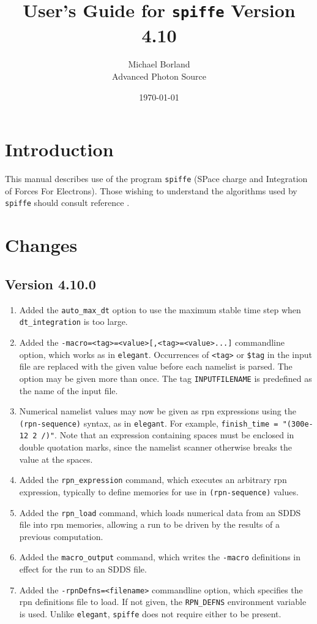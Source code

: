 \documentclass[11pt]{article}
\begin{document}
\title{User's Guide for {\tt spiffe} Version 4.10}
\author{Michael Borland\\Advanced Photon Source\\ \date{\today}}
\maketitle

\section{Introduction}

This manual describes use of the program {\tt spiffe} (SPace charge and
Integration of Forces For Electrons).  Those wishing to understand the
algorithms used by {\tt spiffe} should consult reference \cite{spiffeEqn}.

\section{Changes}
\subsection{Version 4.10.0}
\begin{enumerate}
\item Added the \verb|auto_max_dt| option to use the maximum stable time step when
  \verb|dt_integration| is too large.
\item Added the \verb|-macro=<tag>=<value>[,<tag>=<value>...]| commandline option, which works
  as in {\tt elegant}.  Occurrences of \verb|<tag>| or \verb|$tag| in the input file are replaced
  with the given value before each namelist is parsed.  The option may be given more than once.
  The tag \verb|INPUTFILENAME| is predefined as the name of the input file.
\item Numerical namelist values may now be given as rpn expressions using the
  \verb|(rpn-sequence)| syntax, as in {\tt elegant}.  For example,
  \verb|finish_time = "(300e-12 2 /)"|.  Note that an expression containing spaces must be
  enclosed in double quotation marks, since the namelist scanner otherwise breaks the
  value at the spaces.
\item Added the \verb|rpn_expression| command, which executes an arbitrary rpn expression,
  typically to define memories for use in \verb|(rpn-sequence)| values.
\item Added the \verb|rpn_load| command, which loads numerical data from an SDDS file into
  rpn memories, allowing a run to be driven by the results of a previous computation.
\item Added the \verb|macro_output| command, which writes the \verb|-macro| definitions in
  effect for the run to an SDDS file.
\item Added the \verb|-rpnDefns=<filename>| commandline option, which specifies the rpn
  definitions file to load.  If not given, the \verb|RPN_DEFNS| environment variable is
  used.  Unlike {\tt elegant}, {\tt spiffe} does not require either to be present.
\end{enumerate}
\end{document}
